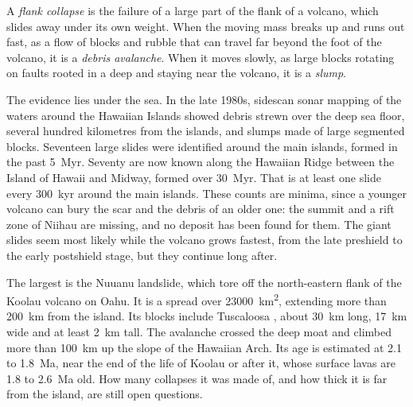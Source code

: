 \begin{definition}\label{def:b2:oceanic-islands:collapse}
A \emph{flank collapse} is the failure of a large part of the flank of a
volcano, which slides away under its own weight. When the moving mass breaks up and runs out
fast, as a flow of blocks and rubble that can travel far beyond the foot of the volcano, it is a
\emph{debris avalanche}. When it moves slowly, as large blocks rotating
on faults rooted in a deep  and staying near the volcano, it is a \emph{slump}.
\end{definition}

The evidence lies under the sea. In the late 1980s, sidescan sonar mapping of the waters around
the Hawaiian Islands showed debris strewn over the deep sea floor, several hundred kilometres from
the islands, and slumps made of large segmented blocks. Seventeen large slides were identified
around the main islands, formed in the past \qty{5}{Myr}. Seventy are now known along the
Hawaiian Ridge between the Island of Hawaii and Midway, formed over \qty{30}{Myr}. That is at
least one slide every \qty{300}{kyr} around the main islands. These counts are minima, since a
younger volcano can bury the scar and the debris of an older one: the summit  and a rift zone
of Niihau are missing, and no deposit has been found for them. The giant slides seem most likely while the
volcano grows fastest, from the late preshield to the early postshield stage, but they continue
long after.

The largest is the Nuuanu landslide, which tore off the north-eastern flank of the Koolau
volcano on Oahu. It is a  spread over \qty{23000}{km^2}, extending more than
\qty{200}{km} from the island. Its blocks include Tuscaloosa , about \qty{30}{km} long,
\qty{17}{km} wide and at least \qty{2}{km} tall. The avalanche crossed the deep moat and climbed
more than \qty{100}{km} up the slope of the Hawaiian Arch. Its age is estimated at 2.1 to
\qty{1.8}{Ma}, near the end of the life of Koolau or after it, whose surface lavas are 1.8 to
\qty{2.6}{Ma} old. How many collapses it was made of, and how thick it is far from the island,
are still open questions.


